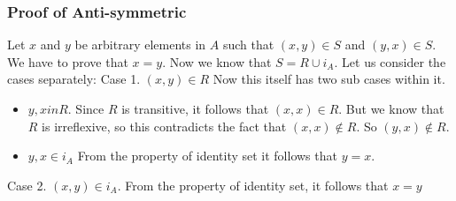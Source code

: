 \documentclass{article}
\begin{document}
\subsubsection{Proof of Anti-symmetric}
Let $x$ and $y$ be arbitrary elements in $A$ such that $(x,y) \in S$
and $(y,x) \in S$. We have to prove that $x = y$. Now we know
that $S = R \cup i_A$. Let us consider the cases separately:
Case 1. $(x,y) \in R$ Now this itself has two sub cases within it.
\begin{itemize}
\item $y,x in R$. Since $R$ is transitive, it follows that $(x,x) \in
  R$. But we know that $R$ is irreflexive, so this contradicts the
  fact that $(x,x) \notin R$. So $(y,x) \notin R$.
\item $y,x \in i_A$ From the property of identity set it follows that
  $y = x$. 
\end{itemize}
Case 2. $(x,y) \in i_A$. From the property of identity set, it follows
that $x = y$
\end{document}
